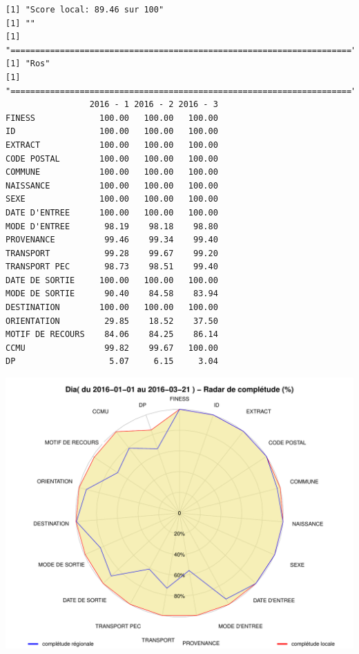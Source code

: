 \documentclass[]{article}
\begin{document}
\begin{verbatim}
[1] "Score local: 89.46 sur 100"
[1] ""
[1] "====================================================================="
[1] "Ros"
[1] "====================================================================="
                 2016 - 1 2016 - 2 2016 - 3
FINESS             100.00   100.00   100.00
ID                 100.00   100.00   100.00
EXTRACT            100.00   100.00   100.00
CODE POSTAL        100.00   100.00   100.00
COMMUNE            100.00   100.00   100.00
NAISSANCE          100.00   100.00   100.00
SEXE               100.00   100.00   100.00
DATE D'ENTREE      100.00   100.00   100.00
MODE D'ENTREE       98.19    98.18    98.80
PROVENANCE          99.46    99.34    99.40
TRANSPORT           99.28    99.67    99.20
TRANSPORT PEC       98.73    98.51    99.40
DATE DE SORTIE     100.00   100.00   100.00
MODE DE SORTIE      90.40    84.58    83.94
DESTINATION        100.00   100.00   100.00
ORIENTATION         29.85    18.52    37.50
MOTIF DE RECOURS    84.06    84.25    86.14
CCMU                99.82    99.67   100.00
DP                   5.07     6.15     3.04
\end{verbatim}

\includegraphics{completude_files/figure-latex/finess-12.pdf}
\end{document}
